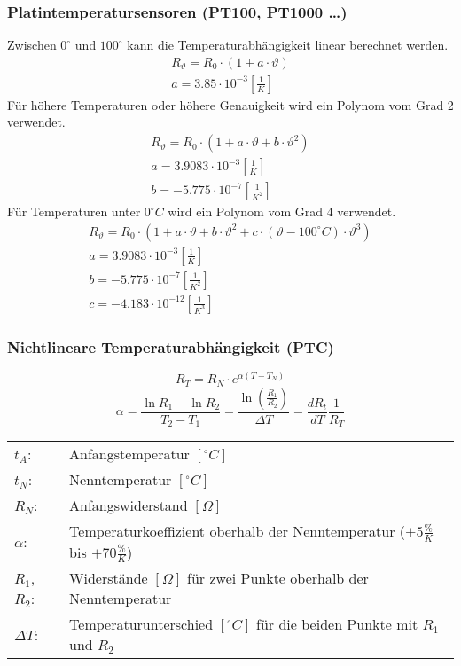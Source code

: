 \subsubsection{Platintemperatursensoren (PT100, PT1000 \dots)}
Zwischen $0^\circ$ und $100^\circ$ kann die Temperaturabhängigkeit linear 
berechnet werden. 
\[ \begin{array}{l}
R_\vartheta = R_0 \cdot (1 + a \cdot \vartheta) \\
a = 3.85 \cdot 10^{-3} \left[\frac{1}{K}\right] 
\end{array} \]
%
Für höhere Temperaturen oder höhere Genauigkeit wird ein Polynom vom Grad 2 
verwendet. 
\[ \begin{array}{l}
R_\vartheta = R_0 \cdot (1 + a \cdot \vartheta + b \cdot \vartheta^2) \\
a = 3.9083 \cdot 10^{-3} \left[\frac{1}{K}\right] \\
b = -5.775 \cdot 10^{-7} \left[\frac{1}{K^2}\right] 
\end{array} \]
%
Für Temperaturen unter $0^\circ C$ wird ein Polynom vom Grad 4 verwendet. 
\[ \begin{array}{l}
R_\vartheta = R_0 \cdot (1 + a \cdot \vartheta + b \cdot \vartheta^2 
+ c \cdot (\vartheta - 100^\circ C) \cdot \vartheta^3) \\
a = 3.9083 \cdot 10^{-3} \left[\frac{1}{K}\right] \\
b = -5.775 \cdot 10^{-7} \left[\frac{1}{K^2}\right] \\
c = -4.183 \cdot 10^{-12} \left[\frac{1}{K^3}\right] 
\end{array} \]

\subsubsection{Nichtlineare Temperaturabhängigkeit (PTC)}
\[ R_T = R_N \cdot e^{\alpha (T - T_N)} \]
\[ \alpha = \frac{\ln R_1 - \ln R_2}{T_2 - T_1} 
= \frac{\ln\left(\frac{R_1}{R_2}\right)}{\Delta T} 
= \frac{d R_t}{d T}\frac{1}{R_T} \]
\begin{tabular}{@{}lp{}}
  $t_A$:        & Anfangstemperatur $[^\circ C]$ \\
  $t_N$:        & Nenntemperatur $[^\circ C]$ \\
  $R_N$:        & Anfangswiderstand $[\Omega]$ \\
  $\alpha$:     & Temperaturkoeffizient oberhalb der Nenntemperatur 
                  ($+5\frac{\%}{K}$ bis $+70\frac{\%}{K}$) \\
  $R_1$, $R_2$: & Widerstände $[\Omega]$ für zwei Punkte oberhalb der 
                  Nenntemperatur \\
  $\Delta T$:   & Temperaturunterschied $[^\circ C]$ für die beiden Punkte mit 
                  $R_1$ und $R_2$
\end{tabular}

